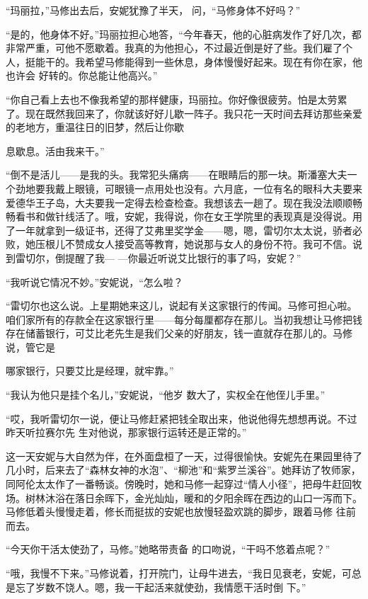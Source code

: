 \documentclass{article}
\begin{document}
“玛丽拉，”马修出去后，安妮犹豫了半天，
问，“马修身体不好吗？” 

“是的，他身体不好。”玛丽拉担心地答，“今年春天，他的心脏病发作了好几次，都非常严重，可他不愿歇着。我真的为他担心，不过最近倒是好了些。我们雇了个人，挺能干的。我希望马修能得到一些休息，身体慢慢好起来。现在有你在家，他也许会
好转的。你总能让他高兴。” 

“你自己看上去也不像我希望的那样健康，玛丽拉。你好像很疲劳。怕是太劳累了。现在既然我回来了，你就该好好儿歇一阵子。我只花一天时间去拜访那些亲爱的老地方，重温往日的旧梦，然后让你歇

\newpage
息歇息。活由我来干。” 

“倒不是活儿——是我的头。我常犯头痛病——在眼睛后的那一块。斯潘塞大夫一个劲地要我戴上眼镜，可眼镜一点用处也没有。六月底，一位有名的眼科大夫要来爱德华王子岛，大夫要我一定得去检查检查。我想该去一趟了。现在我没法顺顺畅畅看书和做针线活了。哦，安妮，我得说，你在女王学院里的表现真是没得说。用了一年就拿到一级证书，还得了艾弗里奖学金——嗯，嗯，雷切尔太太说，骄者必败，她压根儿不赞成女人接受高等教育，她说那与女人的身份不符。我可不信。说到雷切尔，倒提醒了我—
—你最近听说艾比银行的事了吗，安妮？” 

“我听说它情况不妙。”安妮说，“怎么啦？

“雷切尔也这么说。上星期她来这儿，说起有关这家银行的传闻。马修可担心啦。咱们家所有的存款全在这家银行里——每分每厘都存在那儿。当初我想让马修把钱存在储蓄银行，可艾比老先生是我们父亲的好朋友，钱一直就存在那儿的。马修说，管它是

\newpage
哪家银行，只要艾比是经理，就牢靠。” 

“我认为他只是挂个名儿，”安妮说，“他岁
数大了，实权全在他侄儿手里。” 

“哎，我听雷切尔一说，便让马修赶紧把钱全取出来，他说他得先想想再说。不过昨天听拉赛尔先
生对他说，那家银行运转还是正常的。” 

这一天安妮与大自然为伴，在外面盘桓了一天，过得很愉快。安妮先在果园里待了几小时，后来去了“森林女神的水泡”、“柳池”和“紫罗兰溪谷”。她拜访了牧师家，同阿伦太太作了一番畅谈。傍晚时，她和马修一起穿过“情人小径”，把母牛赶回牧场。树林沐浴在落日余晖下，金光灿灿，暖和的夕阳余晖在西边的山口一泻而下。马修低着头慢慢走着，修长而挺拔的安妮也放慢轻盈欢跳的脚步，跟着马修
往前而去。 

“今天你干活太使劲了，马修。”她略带责备
的口吻说，“干吗不悠着点呢？” 

\newpage

“哦，我慢不下来。”马修说着，打开院门，让母牛进去，“我日见衰老，安妮，可总是忘了岁数不饶人。嗯，我一干起活来就使劲，我情愿干活时倒
下。” 
\end{document}
